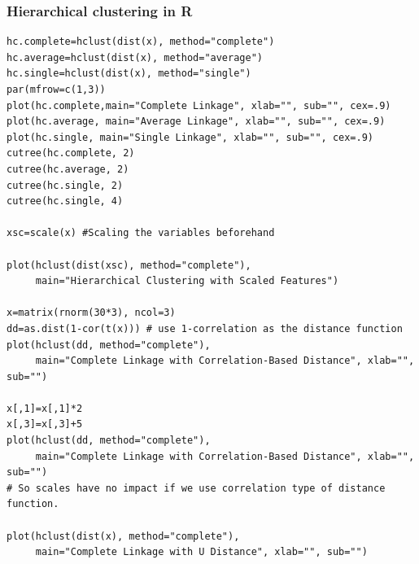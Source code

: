 \documentclass[11pt]{article}
\begin{document}
\subsubsection{Hierarchical clustering in R}
\begin{lstlisting}
hc.complete=hclust(dist(x), method="complete")
hc.average=hclust(dist(x), method="average")
hc.single=hclust(dist(x), method="single")
par(mfrow=c(1,3))
plot(hc.complete,main="Complete Linkage", xlab="", sub="", cex=.9)
plot(hc.average, main="Average Linkage", xlab="", sub="", cex=.9)
plot(hc.single, main="Single Linkage", xlab="", sub="", cex=.9)
cutree(hc.complete, 2)
cutree(hc.average, 2)
cutree(hc.single, 2)
cutree(hc.single, 4)

xsc=scale(x) #Scaling the variables beforehand

plot(hclust(dist(xsc), method="complete"), 
     main="Hierarchical Clustering with Scaled Features")

x=matrix(rnorm(30*3), ncol=3)
dd=as.dist(1-cor(t(x))) # use 1-correlation as the distance function
plot(hclust(dd, method="complete"), 
     main="Complete Linkage with Correlation-Based Distance", xlab="", sub="")

x[,1]=x[,1]*2
x[,3]=x[,3]+5
plot(hclust(dd, method="complete"), 
     main="Complete Linkage with Correlation-Based Distance", xlab="", sub="")
# So scales have no impact if we use correlation type of distance function.

plot(hclust(dist(x), method="complete"), 
     main="Complete Linkage with U Distance", xlab="", sub="")
\end{lstlisting}
\end{document}
